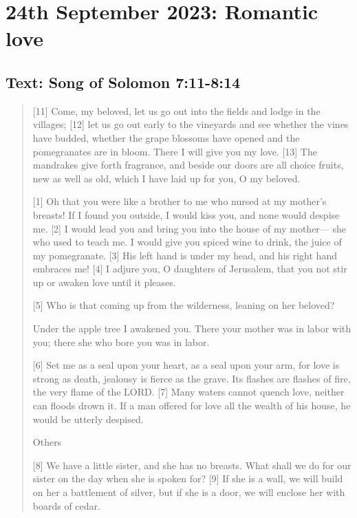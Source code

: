 \setcounter{figure}{0}

\section{24th September 2023: Romantic love}
\subsection*{Text: Song of Solomon 7:11-8:14}
  \begin{quote}
    [11] Come, my beloved,
        let us go out into the fields
        and lodge in the villages;
    [12] let us go out early to the vineyards
        and see whether the vines have budded,
    whether the grape blossoms have opened
        and the pomegranates are in bloom.
    There I will give you my love.
    [13] The mandrakes give forth fragrance,
        and beside our doors are all choice fruits,
    new as well as old,
        which I have laid up for you, O my beloved.


    [1] Oh that you were like a brother to me
        who nursed at my mother’s breasts!
    If I found you outside, I would kiss you,
        and none would despise me.
    [2] I would lead you and bring you
        into the house of my mother—
        she who used to teach me.
    I would give you spiced wine to drink,
        the juice of my pomegranate.
    [3] His left hand is under my head,
        and his right hand embraces me!
    [4] I adjure you, O daughters of Jerusalem,
        that you not stir up or awaken love
        until it pleases.


    [5] Who is that coming up from the wilderness,
        leaning on her beloved?


    Under the apple tree I awakened you.
    There your mother was in labor with you;
        there she who bore you was in labor.


    [6] Set me as a seal upon your heart,
        as a seal upon your arm,
    for love is strong as death,
        jealousy is fierce as the grave.
    Its flashes are flashes of fire,
        the very flame of the LORD.
    [7] Many waters cannot quench love,
        neither can floods drown it.
    If a man offered for love
        all the wealth of his house,
        he would be utterly despised.


        Others

    [8] We have a little sister,
        and she has no breasts.
    What shall we do for our sister
        on the day when she is spoken for?
    [9] If she is a wall,
        we will build on her a battlement of silver,
    but if she is a door,
        we will enclose her with boards of cedar.



\end{quote}
